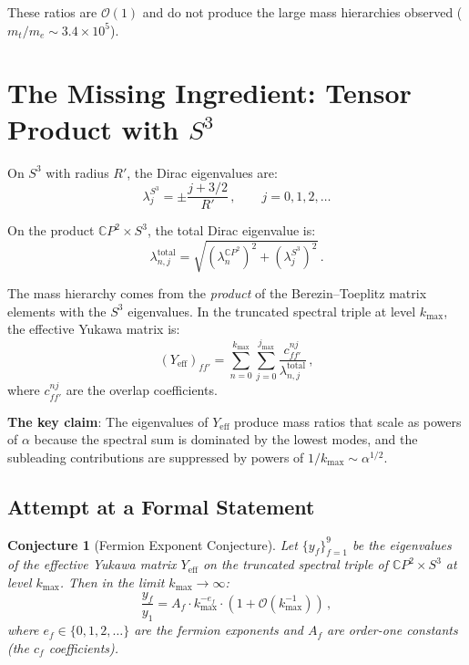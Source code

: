 \documentclass[11pt,a4paper]{article}
\newtheorem{conjecture}{Conjecture}
\newcommand{\CP}{\mathbb{C}P}
\begin{document}
These ratios are $\mathcal{O}(1)$ and do not produce the large mass hierarchies observed ($m_t/m_e \sim 3.4 \times 10^5$).

\section{The Missing Ingredient: Tensor Product with $S^3$}

On $S^3$ with radius $R'$, the Dirac eigenvalues are:
\begin{equation}
\lambda_{j}^{S^3} = \pm\frac{j+3/2}{R'}\,,\qquad j = 0, 1, 2, \ldots
\end{equation}

On the product $\CP^2 \times S^3$, the total Dirac eigenvalue is:
\begin{equation}
\lambda_{n,j}^{\mathrm{total}} = \sqrt{(\lambda_{n}^{\CP^2})^2 + (\lambda_j^{S^3})^2}\,.
\end{equation}

The mass hierarchy comes from the \emph{product} of the Berezin--Toeplitz matrix elements with the $S^3$ eigenvalues. In the truncated spectral triple at level $k_{\max}$, the effective Yukawa matrix is:
\begin{equation}
(Y_{\mathrm{eff}})_{ff'} = \sum_{n=0}^{k_{\max}} \sum_{j=0}^{j_{\max}} \frac{c_{ff'}^{nj}}{\lambda_{n,j}^{\mathrm{total}}}\,,
\end{equation}
where $c_{ff'}^{nj}$ are the overlap coefficients.

\textbf{The key claim}: The eigenvalues of $Y_{\mathrm{eff}}$ produce mass ratios that scale as powers of $\alpha$ because the spectral sum is dominated by the lowest modes, and the subleading contributions are suppressed by powers of $1/k_{\max} \sim \alpha^{1/2}$.

\subsection{Attempt at a Formal Statement}

\begin{conjecture}[Fermion Exponent Conjecture]
Let $\{y_f\}_{f=1}^9$ be the eigenvalues of the effective Yukawa matrix $Y_{\mathrm{eff}}$ on the truncated spectral triple of $\CP^2 \times S^3$ at level $k_{\max}$. Then in the limit $k_{\max} \to \infty$:
\begin{equation}
\frac{y_f}{y_1} = A_f \cdot k_{\max}^{-e_f} \cdot (1 + \mathcal{O}(k_{\max}^{-1}))\,,
\end{equation}
where $e_f \in \{0, 1, 2, \ldots\}$ are the fermion exponents and $A_f$ are order-one constants (the $c_f$ coefficients).
\end{conjecture}
\end{document}
